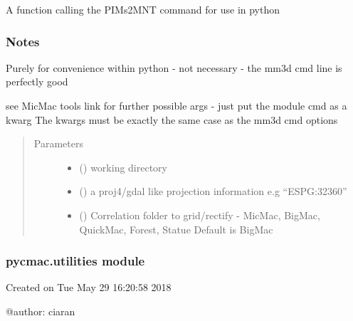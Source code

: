 \documentclass[letterpaper,10pt,english]{sphinxmanual}
\begin{document}
\begin{fulllineitems}
\label{\detokenize{pycmac:dense_match.Tawny}}
A function calling the PIMs2MNT command for use in python
\subsubsection*{Notes}

Purely for convenience within python - not  necessary - the mm3d cmd line
is perfectly good

see MicMac tools link for further possible args - just put the module cmd as a kwarg
The kwargs must be exactly the same case as the mm3d cmd options
\begin{quote}\begin{description}
\item[{Parameters}] \leavevmode\begin{itemize}
\item {} 
 () \textendash{} working directory

\item {} 
 () \textendash{} a proj4/gdal like projection information e.g “ESPG:32360”

\item {} 
 () \textendash{} Correlation folder to grid/rectify - MicMac, BigMac, QuickMac, Forest, Statue
Default is BigMac

\end{itemize}

\end{description}\end{quote}

\end{fulllineitems}



\subsubsection{pycmac.utilities module}
\label{\detokenize{pycmac:module-utilities}}\label{\detokenize{pycmac:pycmac-utilities-module}}
Created on Tue May 29 16:20:58 2018

@author: ciaran
\end{document}
